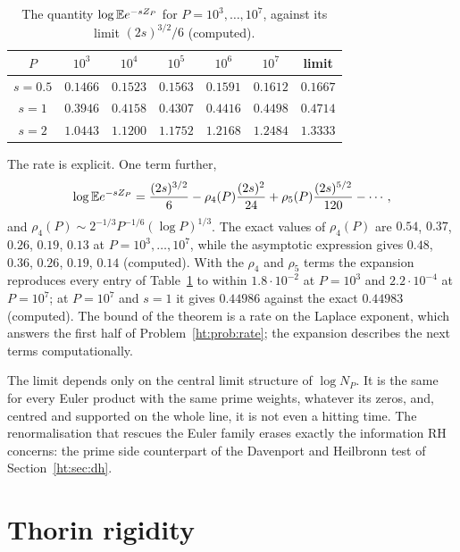 \begin{table}[ht]
\centering
\small\setlength{\tabcolsep}{3.5pt}\begin{tabular}{cccccc|c}
\toprule
$P$ & $10^3$ & $10^4$ & $10^5$ & $10^6$ & $10^7$ & limit\\
\midrule
$s=0.5$ & $0.1466$ & $0.1523$ & $0.1563$ & $0.1591$ & $0.1612$ & $0.1667$\\
$s=1$ & $0.3946$ & $0.4158$ & $0.4307$ & $0.4416$ & $0.4498$ & $0.4714$\\
$s=2$ & $1.0443$ & $1.1200$ & $1.1752$ & $1.2168$ & $1.2484$ & $1.3333$\\
\bottomrule
\end{tabular}
\caption{The quantity $\log\mathbb{E} e^{-sZ_P}$ for $P=10^3,\dots,10^7$, against its limit $(2s)^{3/2}/6$ (computed).}\label{ht:tab:euler32}
\end{table}

The rate is explicit. One term further,
\begin{gather*}
\log\mathbb{E} e^{-sZ_P}=\frac{(2s)^{3/2}}6-\rho_4(P)\frac{(2s)^2}{24}+\rho_5(P)\frac{(2s)^{5/2}}{120}-\cdots,
\end{gather*}
and $\rho_4(P)\sim2^{-1/3}P^{-1/6}(\log P)^{1/3}$. The exact values of $\rho_4(P)$ are $0.54$, $0.37$, $0.26$, $0.19$, $0.13$ at $P=10^3,\dots,10^7$, while the asymptotic expression gives $0.48$, $0.36$, $0.26$, $0.19$, $0.14$ (computed). With the $\rho_4$ and $\rho_5$ terms the expansion reproduces every entry of Table~\ref{ht:tab:euler32} to within $1.8\cdot10^{-2}$ at $P=10^3$ and $2.2\cdot10^{-4}$ at $P=10^7$; at $P=10^7$ and $s=1$ it gives $0.44986$ against the exact $0.44983$ (computed). The bound of the theorem is a rate on the Laplace exponent, which answers the first half of Problem~\ref{ht:prob:rate}; the expansion describes the next terms computationally.

The limit depends only on the central limit structure of $\log N_P$. It is the same for every Euler product with the same prime weights, whatever its zeros, and, centred and supported on the whole line, it is not even a hitting time. The renormalisation that rescues the Euler family erases exactly the information RH concerns: the prime side counterpart of the Davenport and Heilbronn test of Section~\ref{ht:sec:dh}.

\section{Thorin rigidity}\label{ht:sec:rigid}

